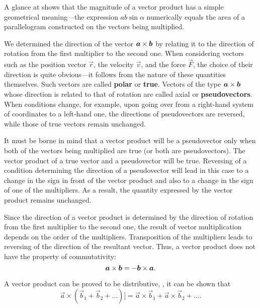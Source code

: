 A glance at  shows that the magnitude of a vector product has a simple geometrical meaning---the expression $ab\sin\alpha$ numerically equals the area of a parallelogram constructed on the vectors being multiplied.

We determined the direction of the vector $\boldsymbol{a}\times\boldsymbol{b}$ by relating it to the direction of rotation from the first multiplier to the second one. When considering vectors such as the position vector $\vec{r}$, the velocity $\vec{v}$, and the force $\vec{F}$, the choice of their direction is quite obvious---it follows from the nature of these quantities themselves. Such vectors are called \textbf{polar} or \textbf{true}. Vectors of the type $\boldsymbol{a}\times\boldsymbol{b}$ whose direction is related to that of rotation are called axial or \textbf{pseudovectors}. When conditions change, for example, upon going over from a right-hand system of coordinates to a left-hand one, the directions of pseudovectors are reversed, while those of true vectors remain unchanged.

It must be borne in mind that a vector product will be a pseudovector only when both of the vectors being multiplied are true (or both are pseudovectors). The vector product of a true vector and a pseudovector will be true. Reversing of a condition determining the direction of a pseudovector will lead in this case to a change in the sign in front of the vector product and also to a change in the sign of one of the multipliers. As a result, the quantity expressed
by the vector product remains unchanged.

Since the direction of a vector product is determined by the direction of rotation from the first multiplier to the second one, the result of vector multiplication depends on the order of the multipliers. Transposition of the multipliers leads to reversing of the direction of the resultant vector. Thus, a vector product does not have the property of commutativity:
\begin{equation}\label{eq:1_29}
\boldsymbol{a}\times\boldsymbol{b} = -\boldsymbol{b}\times\boldsymbol{a}.
\end{equation}

\noindent
A vector product can be proved to be distributive, \ie, it can be shown that
\begin{equation}\label{eq:1_30}
\vec{a}\times(\vec{b}_1+\vec{b}_2+\ldots)] = \vec{a}\times\vec{b}_1 + \vec{a}\times\vec{b}_2 + \ldots.
\end{equation}


